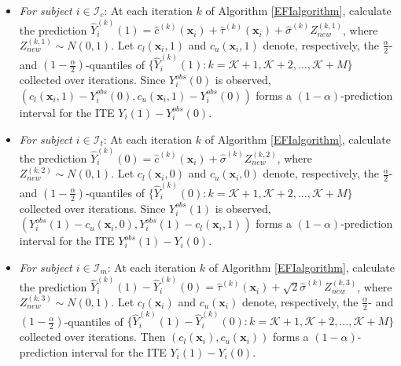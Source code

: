 \documentclass[11pt]{article}
\newcommand{\bx}{{\boldsymbol x}}
\newcommand{\mK}{\mathcal{K}}
\begin{document}
\begin{itemize}
    \item[(i)] %
    {\it For subject $i\in \mathcal{I}_c$}: 
    At each iteration $k$ of Algorithm \ref{EFIalgorithm}, calculate  the prediction  $\hat{Y}_i^{(k)}(1)=\hat{c}^{(k)}(\bx_i)+ \hat{\tau}^{(k)}(\bx_i)+\hat{\sigma}^{(k)} Z_{new}^{(k,1)}$, where $ Z_{new}^{(k,1)}\sim N(0,1)$. Let $c_l(\bx_i,1)$ and $c_u(\bx_i,1)$ denote, respectively, the  
 $\frac{\alpha}{2}$- and $(1-\frac{\alpha}{2})$-quantiles of   $\{\hat{Y}_i^{(k)}(1): k=\mK+1, \mK+2,\ldots, \mK+M\}$
 collected over iterations. 
 Since $Y_i^{obs}(0)$ is observed,  $(c_l(\bx_i,1)-Y_i^{obs}(0),c_u(\bx_i,1)-Y_i^{obs}(0))$ forms a $(1-\alpha)$-prediction interval for the ITE $Y_i(1)-Y_i^{obs}(0)$. 
     
  
    \item[(ii)] %
   {\it For subject $i\in \mathcal{I}_t$}: 
    At each iteration $k$ of Algorithm \ref{EFIalgorithm}, calculate  the prediction   $\hat{Y}_i^{(k)}(0)=\hat{c}^{(k)}(\bx_i)+\hat{\sigma}^{(k)} Z_{new}^{(k,2)}$, where $ Z_{new}^{(k,2)}\sim N(0,1)$. Let $c_l(\bx_i,0)$ and $c_u(\bx_i,0)$ denote, respectively, the  
 $\frac{\alpha}{2}$- and $(1-\frac{\alpha}{2})$-quantiles of   $\{\hat{Y}_i^{(k)}(0): k=\mK+1, \mK+2,\ldots, \mK+M\}$
 collected over iterations. Since $Y_i^{obs}(1)$ is observed,  $(Y_i^{obs}(1)-c_u(\bx_i,0), Y_i^{obs}(1)-c_l(\bx_i,1))$ forms a $(1-\alpha)$-prediction interval for the ITE $Y_i^{obs}(1)-Y_i(0)$. 
    
     

    \item[(iii)] 
  {\it  For subject $i\in \mathcal{I}_m$}: 
At each iteration $k$ of Algorithm \ref{EFIalgorithm}, calculate  the prediction   $\hat{Y}_i^{(k)}(1)-\hat{Y}_i^{(k)}(0)=\hat{\tau}^{(k)}(\bx_i)+\sqrt{2} \hat{\sigma}^{(k)} Z_{new}^{(k,3)}$, where $ Z_{new}^{(k,3)}\sim N(0,1)$. Let $c_l(\bx_i)$ and $c_u(\bx_i)$ denote, respectively, the  
 $\frac{\alpha}{2}$- and $(1-\frac{\alpha}{2})$-quantiles of   $\{
 \hat{Y}_i^{(k)}(1)-\hat{Y}_i^{(k)}(0): k=\mK+1, \mK+2,\ldots, \mK+M\}$
 collected over iterations. 
 Then $(c_l(\bx_i), c_u(\bx_i))$ forms a $(1-\alpha)$-prediction interval for the ITE $Y_i(1)-Y_i(0)$. 
    
\end{itemize}
\end{document}
